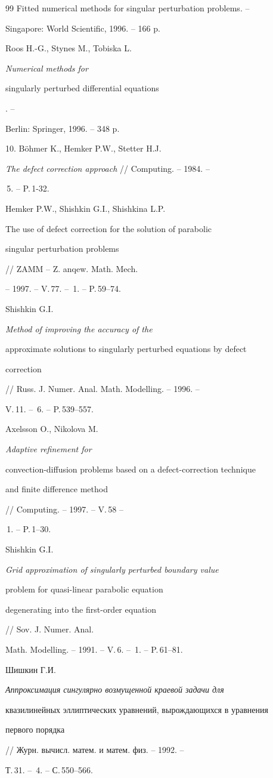 \begin{thebibliography}{99}
{Fitted numerical methods for singular perturbation problems.} --


Singapore: World Scientific, 1996. -- 166 p.




Roos H.-G., Stynes M., Tobiska L. {\it Numerical methods for


singularly perturbed differential equations}. --


Berlin: Springer, 1996. -- 348 p.




10.  B\"ohmer K., Hemker P.W., Stetter H.J.


{\it The defect correction approach} // Computing. -- 1984. --


\No\,5. -- P.\,1-32.




Hemker P.W., Shishkin G.I., Shishkina L.P. {\it


The use of defect correction for the solution of parabolic


singular perturbation problems} // ZAMM -- Z. anqew. Math. Mech.


-- 1997. -- V.\,77. -- \No\,1. -- P.\,59--74.




Shishkin G.I. {\it Method of improving the accuracy of the


approximate solutions to singularly perturbed equations by defect


correction} // Russ. J. Numer. Anal. Math. Modelling. -- 1996. --


V.\,11. -- \No\,6. -- P.\,539--557.




Axelsson O., Nikolova M. {\it Adaptive refinement for


convection-diffusion problems based on a defect-correction technique


and finite difference method} // Computing. -- 1997. -- V.\,58 --


\No\,1. -- P.\,1--30.




Shishkin G.I.


{\it Grid approximation of singularly perturbed boundary value


problem for quasi-linear parabolic equation


degenerating into the first-order equation} // Sov. J. Numer. Anal.


Math. Modelling. -- 1991. -- V.\,6. -- \No\,1. -- P.\,61--81.




Шишкин Г.И.


{\it Аппроксимация сингулярно возмущенной краевой задачи для


квазилинейных эллиптических уравнений, вырождающихся в уравнения


первого порядка} // Журн. вычисл. матем. и матем. физ. -- 1992. --


Т.\,31. -- \No\,4. -- С.\,550--566.





\end{thebibliography}
